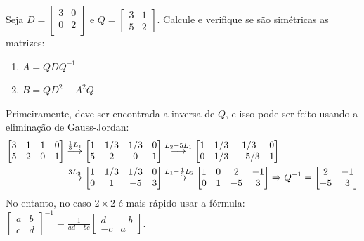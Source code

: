 \documentclass[12pt,a4paper]{article}
\newcommand{\grstep}[2][\relax]{%
   \ensuremath{\mathrel{
       {\mathop{\longrightarrow}\limits^{#2\mathstrut}_{
                                     \begin{subarray}{l} #1 \end{subarray}}}}}}
\begin{document}
\begin{ExerciseList}
\Exercise[title={1,8}] Seja $D=\begin{bmatrix}
3 & 0\\
0 & 2\\
\end{bmatrix}$ e $Q=\begin{bmatrix}
3 & 1\\
5 & 2
\end{bmatrix}$. Calcule e verifique se são simétricas as matrizes:
\begin{multicols}{2}
\begin{enumerate}
\item $A = Q D Q^{-1}$
\item $B = Q D^2 - A^2 Q$
\end{enumerate}
\end{multicols}
\Answer Primeiramente, deve ser encontrada a inversa de $Q$, e isso pode ser feito usando a eliminação de Gauss-Jordan:
\begin{align*}
\begin{bmatrix}
3 & 1 & 1 & 0 \\
5 & 2 & 0 & 1
\end{bmatrix}
& \grstep{ \frac{1}{3}L_1 }
\begin{bmatrix}
1 & 1/3 & 1/3 & 0 \\
5 & 2 & 0 & 1
\end{bmatrix}
\grstep{ L_2 - 5 L_1 }
\begin{bmatrix}
1 & 1/3 & 1/3 & 0 \\
0 & 1/3 & -5/3 & 1
\end{bmatrix} \\
&
\grstep{ 3L_2 }
\begin{bmatrix}
1 & 1/3 & 1/3 & 0 \\
0 & 1 & -5 & 3
\end{bmatrix}
\grstep{ L_1-\frac{1}{3} L_2 }
\begin{bmatrix}
1 & 0 & 2 & -1 \\
0 & 1 & -5 & 3
\end{bmatrix}
\Rightarrow
Q^{-1}=
\begin{bmatrix}
2 & -1 \\
-5 & 3
\end{bmatrix}
\end{align*}
No entanto, no caso $2 \times 2$ é mais rápido usar a fórmula: $\displaystyle \begin{bmatrix}
a & b\\ c & d
\end{bmatrix}^{-1} = \frac{1}{ad-bc} \begin{bmatrix}
d & -b\\ -c & a
\end{bmatrix}$.


\end{ExerciseList}
\end{document}
